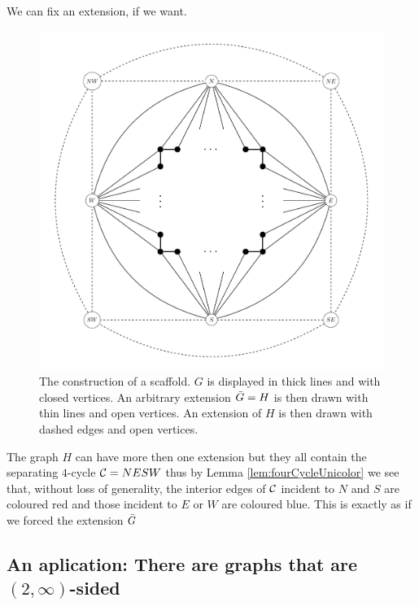 \begin{thrm}
\label{th:fixExtension}
We can fix an extension, if we want.
\end{thrm}

\begin{figure}[h!]
\centering
\includegraphics[scale=0.5]{prelim/img/scafold}

\caption{The construction of a scaffold. $G$ is displayed in thick lines and with closed vertices. An arbitrary extension $\bar{G} =H$ is then drawn with thin lines and open vertices. An extension of $H$ is then drawn with dashed edges and open vertices.
    \label{fig:scafold}}
\end{figure}

The graph $H$ can have more then one extension but they all contain the separating $4$-cycle $\mathcal{C}= NESW$ thus by Lemma \ref{lem:fourCycleUnicolor} we see that, without loss of generality, the interior edges of $\mathcal{C}$ incident to $N$ and $S$ are coloured red and those incident to $E$ or $W$ are coloured blue. This is exactly as if we forced the extension $\bar{G}$

\subsection{An aplication: There are graphs that are $(2, \infty)$-sided}


